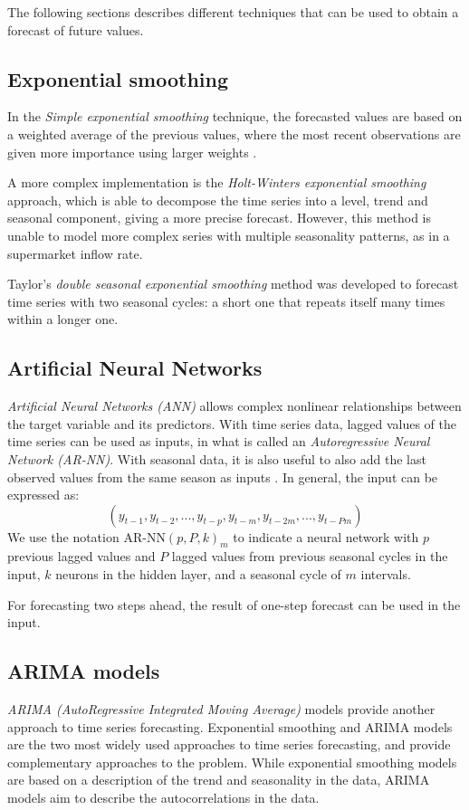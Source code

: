 The following sections describes different techniques that can be used to obtain a forecast of future values.


\subsection{Exponential smoothing}
\label{subsec:exponential_smoothing}
In the \emph{Simple exponential smoothing} technique, the forecasted values are based on a weighted average of the previous values, where the most recent observations are given more importance using larger weights \cite{hyndman}.

A more complex implementation is the \emph{Holt-Winters exponential smoothing} approach, which is able to decompose the time series into a level, trend and seasonal component, giving a more precise forecast. However, this method is unable to model more complex series with multiple seasonality patterns, as in a supermarket inflow rate.

Taylor’s \emph{double seasonal exponential smoothing} method \cite{taylor} was developed to forecast time series with two seasonal cycles: a short one that repeats itself many times within a longer one.


\subsection{Artificial Neural Networks}
\label{subsec:artificial_neural_networks}
\emph{Artificial Neural Networks (ANN)} allows complex nonlinear relationships between the target variable and its predictors. With time series data, lagged values of the time series can be used as inputs, in what is called an \emph{Autoregressive Neural Network (AR-NN)}. With seasonal data, it is also useful to also add the last observed values from the same season as inputs \cite{hyndman}. In general, the input can be expressed as:
\[ (y_{t-1}, y_{t-2}, ..., y_{t-p}, y_{t-m}, y_{t-2m}, ..., y_{t-Pm}) \]
We use the notation \( \text{AR-NN}(p, P, k)_m \) to indicate a neural network with \( p \) previous lagged values and \( P \) lagged values from previous seasonal cycles in the input, \( k \) neurons in the hidden layer, and a seasonal cycle of \( m \) intervals.

For forecasting two steps ahead, the result of one-step forecast can be used in the input.

\subsection{ARIMA models}
\label{subsec:arima_models}
\emph{ARIMA (AutoRegressive Integrated Moving Average)} models provide another approach to time series forecasting. Exponential smoothing and ARIMA models are the two most widely used approaches to time series forecasting, and provide complementary approaches to the problem. While exponential smoothing models are based on a description of the trend and seasonality in the data, ARIMA models aim to describe the autocorrelations in the data.\cite{hyndman}

